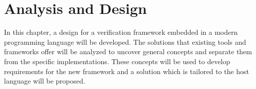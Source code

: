 \chapter{Analysis and Design} %



In this chapter, a design for a verification framework embedded in a modern programming language will be developed. The solutions that existing tools and frameworks offer will be analyzed to uncover general concepts and separate them from the specific implementations. These concepts will be used to develop requirements for the new framework and a solution which is tailored to the host language will be proposed.


